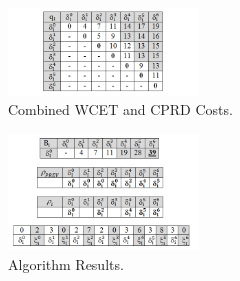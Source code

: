 \begin{figure}[h!]
\vspace{-5pt}
\begin{center}
\includegraphics[width=0.45\textwidth]{algo_example_2.png}
\caption{Combined WCET and CPRD Costs.}
\label{fig:algo_example_2}
\end{center}
\vspace{-5pt}
\end{figure}
\begin{figure}[h!]
\vspace{-5pt}
\begin{center}
\includegraphics[width=0.45\textwidth]{algo_example_3.png}
\caption{Algorithm Results.}
\label{fig:algo_example_3}
\end{center}
\vspace{-10pt}
\end{figure}

